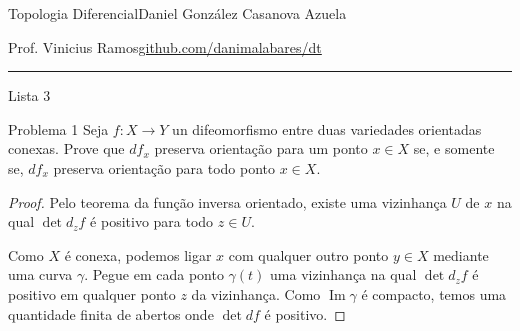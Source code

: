
%




\begin{minipage}{\textwidth}
	\begin{minipage}{1\textwidth}
		Topologia Diferencial\hfill Daniel González Casanova Azuela
		
		{Prof. Vinicius Ramos\hfill\href{https://github.com/danimalabares/dt}{github.com/danimalabares/dt}}
	\end{minipage}
\end{minipage}\vspace{.2cm}\hrule

\vspace{10pt}
{\huge Lista 3}

\vspace{1em}
\begin{thing1}{Problema 1}\label{prob:1}\leavevmode
Seja \(f: X \to Y\) un difeomorfismo entre duas variedades orientadas conexas. Prove que \(df_x\) preserva orientação para um ponto \(x \in X\) se, e somente se, \(df_x\) preserva orientação para todo ponto \(x \in X\).
\end{thing1}

\begin{proof}\leavevmode
Pelo teorema da função inversa orientado,  existe uma vizinhança \(U\) de  \(x\) na qual \(\det d_zf\) é positivo para todo \(z \in U\).

Como \(X\) é conexa, podemos ligar \(x\) com qualquer outro ponto \(y \in X\) mediante uma curva \(\gamma\). Pegue em cada ponto \(\gamma(t)\) uma vizinhança na qual \(\det d_{z}f\) é positivo em qualquer ponto \(z\) da vizinhança. Como \(\operatorname{Im}\gamma\) é compacto, temos uma quantidade finita de abertos onde \(\det df\) é positivo.
\end{proof}


